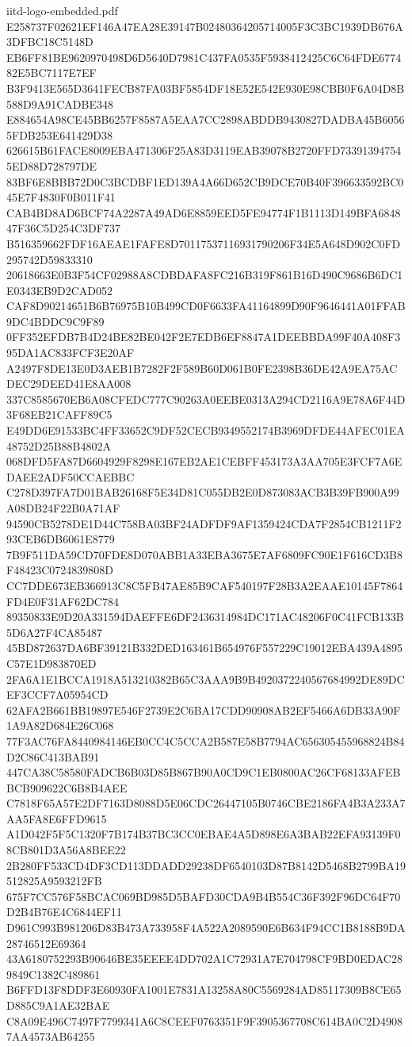 \begin{filecontents*}[overwrite]{iitd-logo-embedded.pdf}
E258737F02621EF146A47EA28E39147B02480364205714005F3C3BC1939DB676A3DFBC18C5148D
EB6FF81BE9620970498D6D5640D7981C437FA0535F5938412425C6C64FDE677482E5BC7117E7EF
B3F9413E565D3641FECB87FA03BF5854DF18E52E542E930E98CBB0F6A04D8B588D9A91CADBE348
E884654A98CE45BB6257F8587A5EAA7CC2898ABDDB9430827DADBA45B60565FDB253E641429D38
626615B61FACE8009EBA471306F25A83D3119EAB39078B2720FFD733913947545ED88D728797DE
83BF6E8BBB72D0C3BCDBF1ED139A4A66D652CB9DCE70B40F396633592BC045E7F4830F0B011F41
CAB4BD8AD6BCF74A2287A49AD6E8859EED5FE94774F1B1113D149BFA684847F36C5D254C3DF737
B516359662FDF16AEAE1FAFE8D70117537116931790206F34E5A648D902C0FD295742D59833310
20618663E0B3F54CF02988A8CDBDAFA8FC216B319F861B16D490C9686B6DC1E0343EB9D2CAD052
CAF8D90214651B6B76975B10B499CD0F6633FA41164899D90F9646441A01FFAB9DC4BDDC9C9F89
0FF352EFDB7B4D24BE82BE042F2E7EDB6EF8847A1DEEBBDA99F40A408F395DA1AC833FCF3E20AF
A2497F8DE13E0D3AEB1B7282F2F589B60D061B0FE2398B36DE42A9EA75ACDEC29DEED41E8AA008
337C8585670EB6A08CFEDC777C90263A0EEBE0313A294CD2116A9E78A6F44D3F68EB21CAFF89C5
E49DD6E91533BC4FF33652C9DF52CECB9349552174B3969DFDE44AFEC01EA48752D25B88B4802A
068DFD5FA87D6604929F8298E167EB2AE1CEBFF453173A3AA705E3FCF7A6EDAEE2ADF50CCAEBBC
C278D397FA7D01BAB26168F5E34D81C055DB2E0D873083ACB3B39FB900A99A08DB24F22B0A71AF
94590CB5278DE1D44C758BA03BF24ADFDF9AF1359424CDA7F2854CB1211F293CEB6DB6061E8779
7B9F511DA59CD70FDE8D070ABB1A33EBA3675E7AF6809FC90E1F616CD3B8F48423C0724839808D
CC7DDE673EB366913C8C5FB47AE85B9CAF540197F28B3A2EAAE10145F7864FD4E0F31AF62DC784
89350833E9D20A331594DAEFFE6DF2436314984DC171AC48206F0C41FCB133B5D6A27F4CA85487
45BD872637DA6BF39121B332DED163461B654976F557229C19012EBA439A4895C57E1D983870ED
2FA6A1E1BCCA1918A513210382B65C3AAA9B9B4920372240567684992DE89DCEF3CCF7A05954CD
62AFA2B661BB19897E546F2739E2C6BA17CDD90908AB2EF5466A6DB33A90F1A9A82D684E26C068
77F3AC76FA8440984146EB0CC4C5CCA2B587E58B7794AC656305455968824B84D2C86C413BAB91
447CA38C58580FADCB6B03D85B867B90A0CD9C1EB0800AC26CF68133AFEBBCB909622C6B8B4AEE
C7818F65A57E2DF7163D8088D5E06CDC26447105B0746CBE2186FA4B3A233A7AA5FA8E6FFD9615
A1D042F5F5C1320F7B174B37BC3CC0EBAE4A5D898E6A3BAB22EFA93139F08CB801D3A56A8BEE22
2B280FF533CD4DF3CD113DDADD29238DF6540103D87B8142D5468B2799BA19512825A9593212FB
675F7CC576F58BCAC069BD985D5BAFD30CDA9B4B554C36F392F96DC64F70D2B4B76E4C6844EF11
D961C993B981206D83B473A733958F4A522A2089590E6B634F94CC1B8188B9DA28746512E69364
43A6180752293B90646BE35EEEE4DD702A1C72931A7E704798CF9BD0EDAC289849C1382C489861
B6FFD13F8DDF3E60930FA1001E7831A13258A80C5569284AD85117309B8CE65D885C9A1AE32BAE
C8A09E496C7497F7799341A6C8CEEF0763351F9F3905367708C614BA0C2D49087AA4573AB64255

\end{filecontents*}
